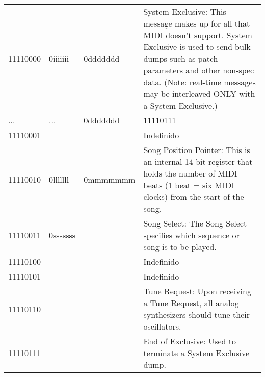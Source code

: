         \begin{center}
        \tablelasttail{\hline}
        \begin{supertabular}{| C{2cm} | C{2cm} | C{2.3cm} | C{8cm} |}
             11110000 & 0iiiiiii & 0ddddddd & System Exclusive: This message makes up for all that MIDI doesn’t support. System Exclusive is used to send bulk dumps such as patch parameters and other non-spec data. (Note: real-time messages may be interleaved ONLY with a System Exclusive.) \\
                ... & ... & 0ddddddd & 11110111 \\
             11110001 &  &  & Indefinido  \\
                11110010 & 0lllllll & 0mmmmmmm & Song Position Pointer: This is an internal 14-bit register that holds the number of MIDI beats (1 beat = six MIDI clocks) from the start of the song. \\
             11110011 & 0sssssss &  & Song Select: The Song Select specifies which sequence or song is to be played. \\
                11110100 &  &  & Indefinido           \\
             11110101 &  &  & Indefinido           \\
                11110110 &  &  & Tune Request: Upon receiving a Tune Request, all analog synthesizers should tune their oscillators. \\
             11110111 &  &  & End of Exclusive: Used to terminate a System Exclusive dump. \\
        \end{supertabular}
        \end{center}

